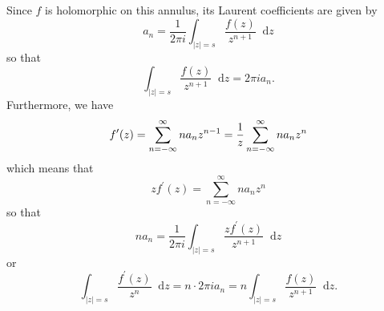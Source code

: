 \documentclass{article}
\newcommand\dif{\mathop{}\!\mathrm{d}}
\begin{document}
\begin{Answer}
Since $f$ is holomorphic on this annulus, its Laurent
coefficients are given by
$$
  a_n 
= \frac{1}{2 \pi i} 
  \int_{|z| = s}
    \frac{f(z)}{z^{n+1}}
    \dif z
$$
so that
$$
\int_{|z| = s}
    \frac{f(z)}{z^{n+1}}
    \dif z
= 2 \pi i a_n.
$$
Furthermore, we have
$$
   f^\prime(z)
= \sum_{n=-\infty}^\infty n a_n z^{n-1} \\
= \frac{1}{z} \sum_{n=-\infty}^{\infty} n a_n z^n 
$$
which means that
$$
z f^\prime(z) = \sum_{n=-\infty}^\infty n a_n z^n
$$
so that
$$
  n a_n 
= \frac{1}{2 \pi i}
  \int_{|z| = s}
    \frac{z f^\prime(z)}{z^{n+1}}
    \dif z
$$
or
$$
  \int_{|z| = s}
    \frac{f^\prime(z)}{z^n}
    \dif z
= n \cdot 2 \pi i a_n
= n \int_{|z| = s}
      \frac{f(z)}{z^{n+1}}
      \dif z.
$$

\end{Answer}
\end{document}
